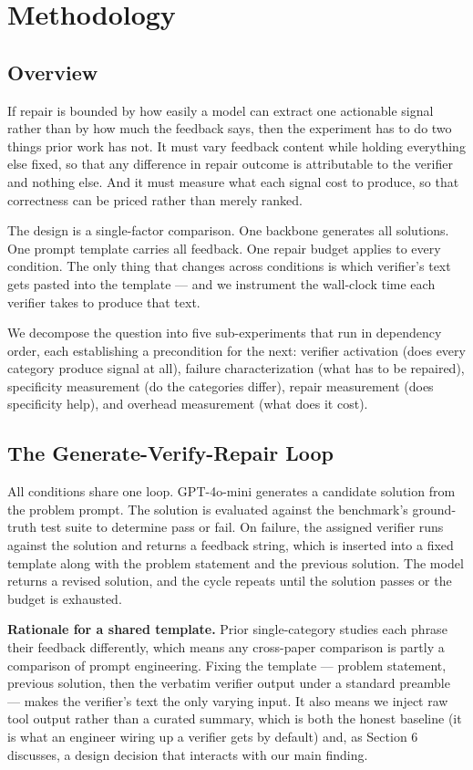 \section{Methodology}

\subsection{Overview}

If repair is bounded by how easily a model can extract one actionable signal rather than by how much the feedback says, then the experiment has to do two things prior work has not. It must vary feedback content while holding everything else fixed, so that any difference in repair outcome is attributable to the verifier and nothing else. And it must measure what each signal cost to produce, so that correctness can be priced rather than merely ranked.

The design is a single-factor comparison. One backbone generates all solutions. One prompt template carries all feedback. One repair budget applies to every condition. The only thing that changes across conditions is which verifier's text gets pasted into the template --- and we instrument the wall-clock time each verifier takes to produce that text.

We decompose the question into five sub-experiments that run in dependency order, each establishing a precondition for the next: verifier activation (does every category produce signal at all), failure characterization (what has to be repaired), specificity measurement (do the categories differ), repair measurement (does specificity help), and overhead measurement (what does it cost).

\subsection{The Generate-Verify-Repair Loop}

All conditions share one loop. GPT-4o-mini generates a candidate solution from the problem prompt. The solution is evaluated against the benchmark's ground-truth test suite to determine pass or fail. On failure, the assigned verifier runs against the solution and returns a feedback string, which is inserted into a fixed template along with the problem statement and the previous solution. The model returns a revised solution, and the cycle repeats until the solution passes or the budget is exhausted.

\textbf{Rationale for a shared template.} Prior single-category studies each phrase their feedback differently, which means any cross-paper comparison is partly a comparison of prompt engineering. Fixing the template --- problem statement, previous solution, then the verbatim verifier output under a standard preamble --- makes the verifier's text the only varying input. It also means we inject raw tool output rather than a curated summary, which is both the honest baseline (it is what an engineer wiring up a verifier gets by default) and, as Section 6 discusses, a design decision that interacts with our main finding.

